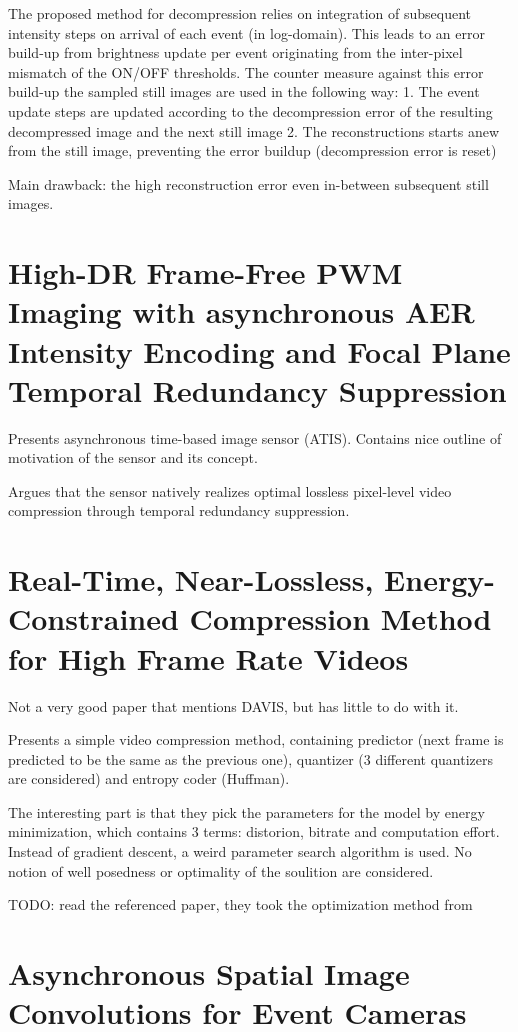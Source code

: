 \documentclass[10pt,a4paper]{article}
\begin{document}
The proposed method for decompression relies on integration of subsequent intensity steps on arrival of each event (in log-domain).
This leads to an error build-up from brightness update per event originating from the inter-pixel mismatch of the ON/OFF thresholds.
The counter measure against this error build-up the sampled still images are used in the following way:
1. The event update steps are updated according to the decompression error of the resulting decompressed image and the next still image
2. The reconstructions starts anew from the still image, preventing the error buildup (decompression error is reset)

Main drawback: the high reconstruction error even in-between subsequent still images.

\section{High-DR Frame-Free PWM Imaging with asynchronous AER Intensity Encoding and Focal Plane Temporal Redundancy Suppression}
Presents asynchronous time-based image sensor (ATIS).
Contains nice outline of motivation of the sensor and its concept.

Argues that the sensor natively realizes optimal lossless pixel-level video compression through temporal redundancy suppression.

\section{Real-Time, Near-Lossless, Energy-Constrained Compression Method for High Frame Rate Videos}
Not a very good paper that mentions DAVIS, but has little to do with it.

Presents a simple video compression method, containing predictor (next frame is predicted to be the same as the previous one),
quantizer (3 different quantizers are considered) and entropy coder (Huffman).

The interesting part is that they pick the parameters for the model by energy minimization, which contains 3 terms: distorion, bitrate and computation effort.
Instead of gradient descent, a weird parameter search algorithm is used. No notion of well posedness or optimality of the soulition are considered.

TODO: read the referenced paper, they took the optimization method from

\section{Asynchronous Spatial Image Convolutions for Event Cameras}
\end{document}
